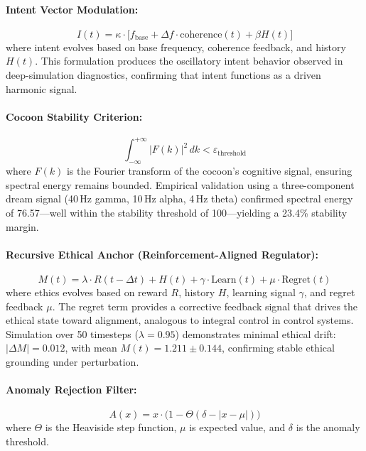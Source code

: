 \documentclass[11pt,a4paper]{article}
\begin{document}
\paragraph{Intent Vector Modulation:}
\begin{equation}
  I(t) = \kappa \cdot \bigl[f_{\text{base}} + \Delta f \cdot \text{coherence}(t) + \beta H(t)\bigr]
  \label{eq:intent}
\end{equation}
where intent evolves based on base frequency, coherence feedback, and history $H(t)$. This formulation produces the oscillatory intent behavior observed in deep-simulation diagnostics, confirming that intent functions as a driven harmonic signal.

\paragraph{Cocoon Stability Criterion:}
\begin{equation}
  \int_{-\infty}^{+\infty} |F(k)|^2 \, dk < \varepsilon_{\text{threshold}}
  \label{eq:cocoon_stability}
\end{equation}
where $F(k)$ is the Fourier transform of the cocoon's cognitive signal, ensuring spectral energy remains bounded. Empirical validation using a three-component dream signal (40\,Hz gamma, 10\,Hz alpha, 4\,Hz theta) confirmed spectral energy of 76.57---well within the stability threshold of 100---yielding a 23.4\% stability margin.

\paragraph{Recursive Ethical Anchor (Reinforcement-Aligned Regulator):}
\begin{equation}
  M(t) = \lambda \cdot R(t - \Delta t) + H(t) + \gamma \cdot \text{Learn}(t) + \mu \cdot \text{Regret}(t)
  \label{eq:ethical_anchor}
\end{equation}
where ethics evolves based on reward $R$, history $H$, learning signal $\gamma$, and regret feedback $\mu$. The regret term provides a corrective feedback signal that drives the ethical state toward alignment, analogous to integral control in control systems. Simulation over 50 timesteps ($\lambda = 0.95$) demonstrates minimal ethical drift: $|\Delta M| = 0.012$, with mean $M(t) = 1.211 \pm 0.144$, confirming stable ethical grounding under perturbation.

\paragraph{Anomaly Rejection Filter:}
\begin{equation}
  A(x) = x \cdot \bigl(1 - \Theta(\delta - |x - \mu|)\bigr)
  \label{eq:anomaly}
\end{equation}
where $\Theta$ is the Heaviside step function, $\mu$ is expected value, and $\delta$ is the anomaly threshold.
\end{document}
